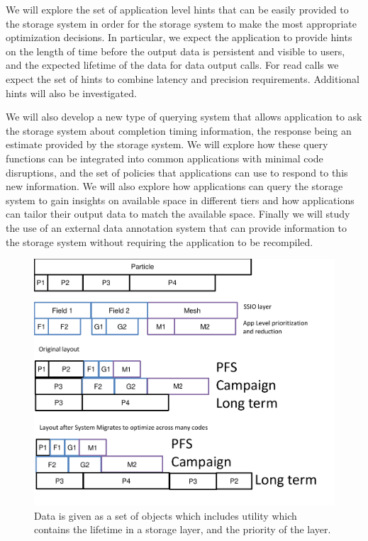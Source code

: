 We will explore the
set of application level hints that can be easily provided to the storage
system in order for the storage system to make the most appropriate
optimization decisions. In particular, we expect the application to provide
hints on the length of time before the output data is persistent and
visible to users, and the expected lifetime of the data for data output
calls. For read calls we expect the set of hints to combine latency and
precision requirements. Additional hints will also be investigated. 

We will also develop a new type of querying system that allows application
to ask the storage system about completion timing information, the response
being an estimate provided by the storage system. We will explore how these
query functions can be integrated into common applications with minimal code
disruptions, and the set of policies that applications can use to respond to
this new information. We will also explore how applications can query the
storage system to gain insights on available space in different tiers and
how applications can tailor their output data to match the available space. 
Finally we will study the use of an external data annotation system that can
provide information to the storage system without requiring the application
to be recompiled. 

\begin{figure}
        \begin{centering} 
	\includegraphics[scale=0.77]{graphics/SSIO-bucket.pdf}
        \caption{Data is given as a set of objects which includes utility which contains the lifetime in a storage layer, and the priority of the layer.}
        \label{fig:ssio-bucket}
        \end{centering}
\end{figure}

